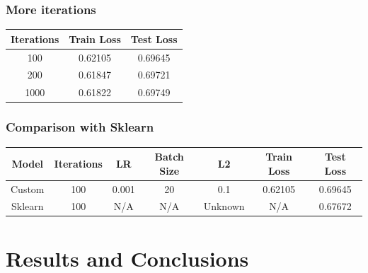 \documentclass[
	letterpaper, %
	10pt, %
]{class}
\begin{document}
\subsubsection{More iterations}

\begin{center}
    \begin{tabular}{ |c|c|c| }
        \hline
        Iterations & Train Loss & Test Loss \\
        \hline
        100        & 0.62105    & 0.69645   \\
        200        & 0.61847    & 0.69721   \\
        1000       & 0.61822    & 0.69749   \\
        \hline
    \end{tabular}
\end{center}

\subsubsection{Comparison with Sklearn}

\begin{center}
    \begin{tabular}{ |c|c|c|c|c|c|c| }
        \hline
        Model   & Iterations & LR    & Batch Size & L2      & Train Loss & Test Loss \\
        \hline
        Custom  & 100        & 0.001 & 20         & 0.1     & 0.62105    & 0.69645   \\
        Sklearn & 100        & N/A   & N/A        & Unknown & N/A        & 0.67672   \\
        \hline
    \end{tabular}
\end{center}



\section{Results and Conclusions}
\end{document}
